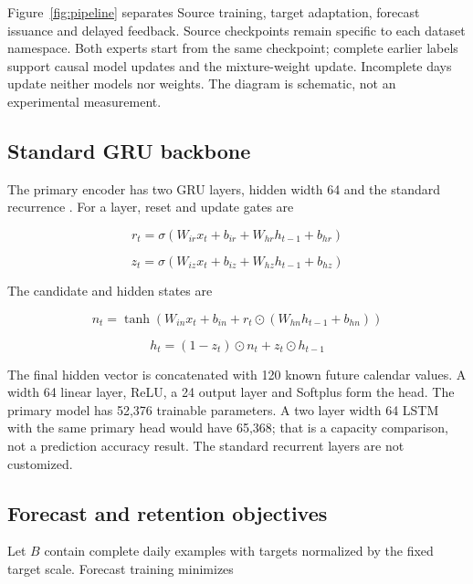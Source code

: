 \documentclass[pdflatex,iicol,sn-mathphys-num]{sn-jnl}
\begin{document}
Figure~\ref{fig:pipeline} separates Source training, target adaptation, forecast issuance and delayed feedback. Source checkpoints remain specific to each dataset namespace. Both experts start from the same checkpoint; complete earlier labels support causal model updates and the mixture-weight update. Incomplete days update neither models nor weights. The diagram is schematic, not an experimental measurement.




\subsection{Standard GRU backbone}

The primary encoder has two GRU layers, hidden width 64 and the standard recurrence \cite{pytorch211}. For a layer, reset and update gates are

\begin{equation}
r_t=\sigma(W_{ir}x_t+b_{ir}+W_{hr}h_{t-1}+b_{hr})
\end{equation}

\begin{equation}
z_t=\sigma(W_{iz}x_t+b_{iz}+W_{hz}h_{t-1}+b_{hz})
\end{equation}

The candidate and hidden states are

\begin{equation}
n_t=\tanh(W_{in}x_t+b_{in}+r_t\odot(W_{hn}h_{t-1}+b_{hn}))
\end{equation}

\begin{equation}
h_t=(1-z_t)\odot n_t+z_t\odot h_{t-1}
\end{equation}

The final hidden vector is concatenated with 120 known future calendar values. A width 64 linear layer, ReLU, a 24 output layer and Softplus form the head. The primary model has 52,376 trainable parameters. A two layer width 64 LSTM with the same primary head would have 65,368; that is a capacity comparison, not a prediction accuracy result. The standard recurrent layers are not customized.

\subsection{Forecast and retention objectives}

Let $B$ contain complete daily examples with targets normalized by the fixed target scale. Forecast training minimizes
\end{document}
